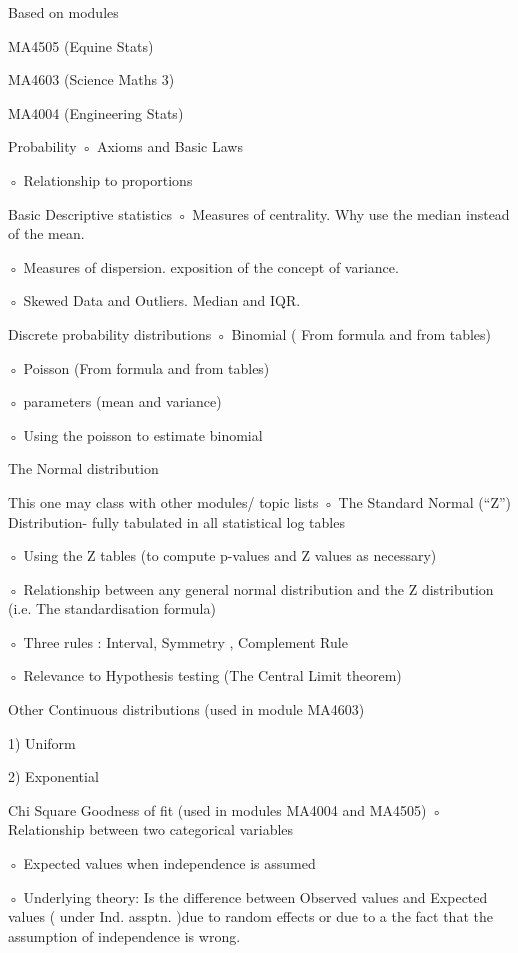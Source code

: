 \documentclass[12pt]{article}
\begin{document}
Based on modules 

MA4505 (Equine Stats)

MA4603 (Science Maths 3)

MA4004 (Engineering Stats)


Probability
◦
Axioms and Basic Laws

◦
Relationship to proportions



Basic Descriptive statistics
◦
Measures of centrality. Why use the median instead of the mean.

◦
Measures of dispersion.  exposition of the concept of variance.

◦
Skewed Data and Outliers. Median and IQR.



Discrete probability distributions
◦
Binomial ( From formula and from tables)

◦
Poisson (From formula and from tables)

◦
parameters (mean and variance)

◦
Using the poisson to estimate binomial



The Normal distribution 

This one may class with other modules/ topic lists
◦
The Standard Normal (“Z”) Distribution- fully tabulated in all statistical log tables

◦
Using the Z tables (to compute p-values and Z values as necessary)

◦
Relationship between any general normal distribution and the Z distribution (i.e. The standardisation formula)

◦
Three rules : Interval, Symmetry , Complement Rule

◦
Relevance to Hypothesis testing (The Central Limit theorem)



Other Continuous distributions (used in module MA4603)

    1) Uniform

    2) Exponential


Chi Square Goodness of fit (used in modules MA4004 and MA4505)
◦
Relationship between two categorical variables

◦
Expected values when independence is assumed

◦
Underlying theory: Is the difference between Observed values and Expected values ( under Ind. assptn. )due to random effects or due to a the fact that the assumption of     independence is wrong.
\end{document}
